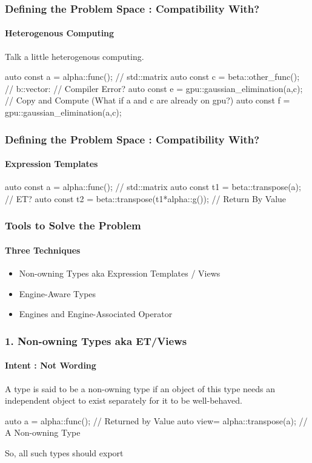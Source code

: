 \documentclass[dvipsnames,10pt]{jbeamer}
\begin{document}
\begin{frame}[fragile]
  \frametitle{Defining the Problem Space : Compatibility With?}
  \framesubtitle{Heterogenous Computing}

Talk a little heterogenous computing.
\begin{acodecpp}{}
auto const a = alpha::func(); // std::matrix
auto const c = beta::other_func(); // b::vector:
// Compiler Error?
auto const e = gpu::gaussian_elimination(a,c);
// Copy and Compute (What if a and c are already on gpu?)
auto const f = gpu::gaussian_elimination(a,c);
\end{acodecpp}
\end{frame}

\begin{frame}[fragile]
  \frametitle{Defining the Problem Space : Compatibility With?}
  \framesubtitle{Expression Templates}

\begin{acodecpp}{}
auto const a = alpha::func(); // std::matrix
auto const t1 = beta::transpose(a); // ET?
auto const t2 = beta::transpose(t1*alpha::g()); // Return By Value
\end{acodecpp}
\end{frame}

\begin{frame}[fragile]
  \frametitle{Tools to Solve the Problem}
  \framesubtitle{Three Techniques}

  \begin{itemize}
    \item  Non-owning Types aka Expression Templates / Views
    \item  Engine-Aware Types
    \item  Engines and Engine-Associated Operator
  \end{itemize}
\end{frame}

\begin{frame}[fragile]
  \frametitle{1. Non-owning Types aka ET/Views}
  \framesubtitle{Intent : Not Wording}

  A type is said to be a non-owning type if an object of this type needs an
  independent object to exist separately for it to be well-behaved.

\begin{acodecpp}{}
auto a = alpha::func(); // Returned by Value
auto view= alpha::transpose(a); // A Non-owning Type
\end{acodecpp}

So, all such types should export

\end{frame}
\end{document}
